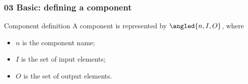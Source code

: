 
\begin{frame}
    \frametitle{03 Basic: defining a component}

    \begin{block}{Component definition}
        A \alert{component} is represented by
        \alert{$\angled{n, I, O}$}, where

        \vspace{.75em}

        \begin{itemize}\setlength{\itemsep}{.5em}
            \item \alert{$n$} is the component name;
            \item \alert{$I$} is the set of input elements;
            \item \alert{$O$} is the set of output elements.
        \end{itemize}
    \end{block}
\end{frame}
